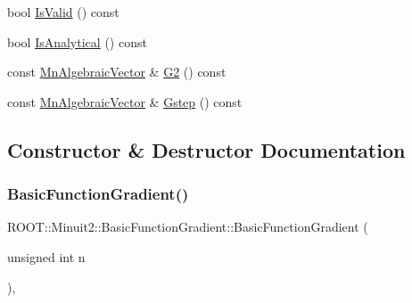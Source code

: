 \begin{DoxyCompactItemize}
\item 
bool \mbox{\hyperlink{classROOT_1_1Minuit2_1_1BasicFunctionGradient_a53963689701d2b3477e176920efdd3f9}{Is\+Valid}} () const
\item 
bool \mbox{\hyperlink{classROOT_1_1Minuit2_1_1BasicFunctionGradient_a6e4d212f4a441b9b58c6886b2c4c50ce}{Is\+Analytical}} () const
\item 
const \mbox{\hyperlink{namespaceROOT_1_1Minuit2_a62ed97730a1ca8d3fbaec64a19aa11c9}{Mn\+Algebraic\+Vector}} \& \mbox{\hyperlink{classROOT_1_1Minuit2_1_1BasicFunctionGradient_a7d06765b80da1a8baa4af474b503ec6c}{G2}} () const
\item 
const \mbox{\hyperlink{namespaceROOT_1_1Minuit2_a62ed97730a1ca8d3fbaec64a19aa11c9}{Mn\+Algebraic\+Vector}} \& \mbox{\hyperlink{classROOT_1_1Minuit2_1_1BasicFunctionGradient_a32966146618c6e1435f76dd851e7c014}{Gstep}} () const
\end{DoxyCompactItemize}


\subsection{Constructor \& Destructor Documentation}
\mbox{\label{classROOT_1_1Minuit2_1_1BasicFunctionGradient_ae23497e9b9a0f07542b5f6a017db6259}} 
\subsubsection{\texorpdfstring{BasicFunctionGradient()}{BasicFunctionGradient()}\hspace{0.1cm}{\footnotesize\ttfamily [1/12]}}
{\footnotesize\ttfamily R\+O\+O\+T\+::\+Minuit2\+::\+Basic\+Function\+Gradient\+::\+Basic\+Function\+Gradient (\begin{DoxyParamCaption}\item[{unsigned int}]{n }\end{DoxyParamCaption})\hspace{0.3cm}{\ttfamily [inline]}, {\ttfamily [explicit]}}

\mbox{\label{classROOT_1_1Minuit2_1_1BasicFunctionGradient_aace69521fac422830a6a6e19b1f6fd77}} 
